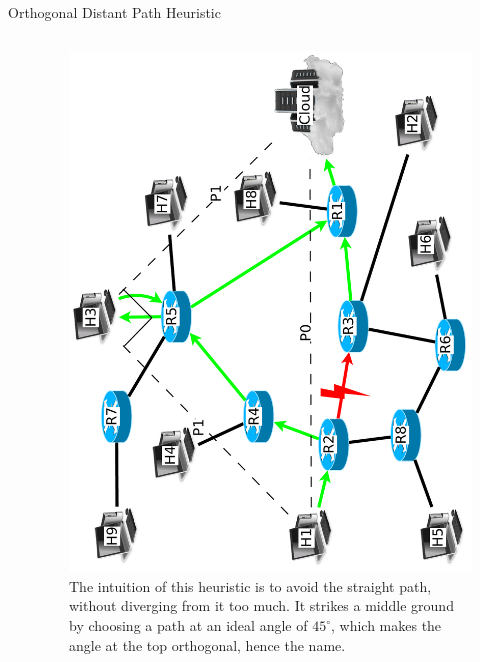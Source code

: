 \documentclass[pdftex]{beamer}
\begin{document}

\begin{frame}{Orthogonal Distant Path Heuristic}
\begin{columns}
\begin{column}{.5\textwidth}



\end{column}
	
\begin{column}{.5\textwidth}
\begin{figure}
\includegraphics[height=\textwidth,angle=-90]{angular_path}
\caption{The intuition of this heuristic is to avoid the straight path, without diverging from it too much.  It strikes a middle ground by choosing a path at an ideal angle of $45^{\circ}$, which makes the angle at the top orthogonal, hence the name.}
\end{figure}
\end{column}

\end{columns}
\end{frame}

\end{document}
